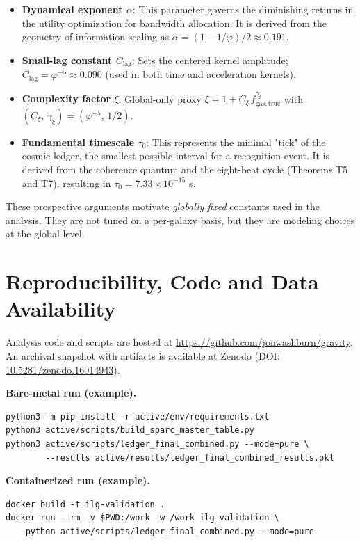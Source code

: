 \documentclass[12pt,a4paper]{article}
\begin{document}
\begin{itemize}
    \item \textbf{Dynamical exponent $\alpha$}: This parameter governs the diminishing returns in the utility optimization for bandwidth allocation. It is derived from the geometry of information scaling as $\alpha = (1-1/\varphi)/2 \approx 0.191$.
    
    \item \textbf{Small-lag constant $C_\mathrm{lag}$}: Sets the centered kernel amplitude; $C_\mathrm{lag} = \varphi^{-5} \approx 0.090$ (used in both time and acceleration kernels).
    
    \item \textbf{Complexity factor $\xi$}: Global-only proxy $\xi = 1 + C_\xi\, f_\mathrm{gas,true}^{\gamma_\xi}$ with $(C_\xi,\,\gamma_\xi) = (\varphi^{-5},\,1/2)$.
    
    \item \textbf{Fundamental timescale $\tau_0$}: This represents the minimal "tick" of the cosmic ledger, the smallest possible interval for a recognition event. It is derived from the coherence quantum and the eight-beat cycle (Theorems T5 and T7), resulting in $\tau_0 = 7.33 \times 10^{-15}$ s.
\end{itemize}

These prospective arguments motivate \emph{globally fixed} constants used in the analysis. They are not tuned on a per-galaxy basis, but they are modeling choices at the global level.

\section*{Reproducibility, Code and Data Availability}
\noindent
Analysis code and scripts are hosted at \href{https://github.com/jonwashburn/gravity}{https://github.com/jonwashburn/gravity}. An archival snapshot with artifacts is available at Zenodo (DOI: \href{https://doi.org/10.5281/zenodo.16014943}{10.5281/zenodo.16014943}).

\noindent\textbf{Bare-metal run (example).}
\begin{verbatim}
python3 -m pip install -r active/env/requirements.txt
python3 active/scripts/build_sparc_master_table.py
python3 active/scripts/ledger_final_combined.py --mode=pure \
        --results active/results/ledger_final_combined_results.pkl
\end{verbatim}

\noindent\textbf{Containerized run (example).}
\begin{verbatim}
docker build -t ilg-validation .
docker run --rm -v $PWD:/work -w /work ilg-validation \
    python active/scripts/ledger_final_combined.py --mode=pure
\end{verbatim}
\end{document}
